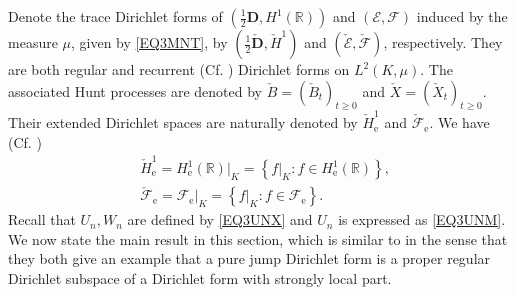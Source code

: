 \documentclass[a4paper]{amsart}
\theoremstyle{definition}
\theoremstyle{remark}
\numberwithin{equation}{section}
\begin{document}
Denote the trace Dirichlet forms of $(\frac{1}{2}\mathbf{D}, H^1(\mathbb{R}))$ and $({{\mathcal{E}}},{{\mathcal{F}}})$ induced by the measure $\mu$, given by \eqref{EQ3MNT}, by $(\frac{1}{2}\check{\mathbf{D}}, \check{H}^1)$ and $(\check{{\mathcal{E}}},\check{{\mathcal{F}}})$, respectively. They are both regular and recurrent (Cf. \cite[Theorem~5.2.5]{CF12}) Dirichlet forms on $L^2(K,\mu)$. The associated Hunt processes are denoted by $\check{B}=(\check{B}_t)_{t\geq 0}$ and $\check{X}=(\check{X}_t)_{t\geq 0}$. Their extended Dirichlet spaces are naturally denoted by $\check{H}^1_\mathrm{e}$ and $\check{{\mathcal{F}}}_\mathrm{e}$. We have (Cf. \cite[Theorem~5.2.15]{CF12})
\[
\begin{aligned}
&\check{H}^1_\mathrm{e}=H^1_\mathrm{e}(\mathbb{R})|_K = \left\{f|_K: f\in H^1_\mathrm{e}(\mathbb{R}) \right\}, \\
&\check{{\mathcal{F}}}_\mathrm{e}={{\mathcal{F}}}_\mathrm{e}|_K =\left\{f|_{K}: f\in {{\mathcal{F}}}_\mathrm{e}\right\}.
\end{aligned}
\]
Recall that $U_n, W_n$ are defined by \eqref{EQ3UNX} and $U_n$ is expressed as \eqref{EQ3UNM}. We now state the main result in this section, which is similar to \cite[Theorem~2.1]{LY14} in the sense that they both give an example that a pure jump Dirichlet form is a proper regular Dirichlet subspace of a Dirichlet form with strongly local part.
\end{document}
